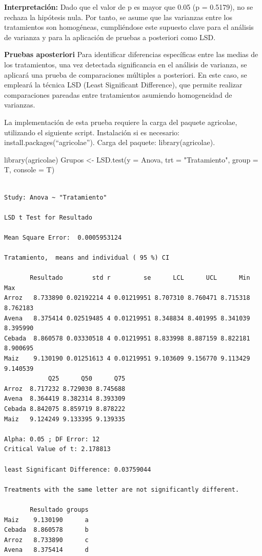 \documentclass[
  letterpaper,
  DIV=11,
  numbers=noendperiod]{scrreprt}
\newenvironment{Shaded}{\begin{snugshade}}{\end{snugshade}}
\newcommand{\AttributeTok}[1]{\textcolor[rgb]{0.40,0.45,0.13}{#1}}
\newcommand{\FunctionTok}[1]{\textcolor[rgb]{0.28,0.35,0.67}{#1}}
\newcommand{\NormalTok}[1]{\textcolor[rgb]{0.00,0.23,0.31}{#1}}
\newcommand{\OtherTok}[1]{\textcolor[rgb]{0.00,0.23,0.31}{#1}}
\newcommand{\StringTok}[1]{\textcolor[rgb]{0.13,0.47,0.30}{#1}}
\begin{document}
\textbf{Interpretación:} Dado que el valor de p es mayor que 0.05 (p =
0.5179), no se rechaza la hipótesis nula. Por tanto, se asume que las
varianzas entre los tratamientos son homogéneas, cumpliéndose este
supuesto clave para el análisis de varianza y para la aplicación de
pruebas a posteriori como LSD.

\textbf{Pruebas aposteriori} Para identificar diferencias específicas
entre las medias de los tratamientos, una vez detectada significancia en
el análisis de varianza, se aplicará una prueba de comparaciones
múltiples a posteriori. En este caso, se empleará la técnica LSD (Least
Significant Difference), que permite realizar comparaciones pareadas
entre tratamientos asumiendo homogeneidad de varianzas.

La implementación de esta prueba requiere la carga del paquete
agricolae, utilizando el siguiente script. Instalación si es necesario:
install.packages(``agricolae''). Carga del paquete: library(agricolae).

\begin{Shaded}
\begin{Highlighting}[]
\FunctionTok{library}\NormalTok{(agricolae)}
\NormalTok{Grupos }\OtherTok{\textless{}{-}} \FunctionTok{LSD.test}\NormalTok{(}\AttributeTok{y =}\NormalTok{ Anova, }\AttributeTok{trt =} \StringTok{"Tratamiento"}\NormalTok{, }\AttributeTok{group =}\NormalTok{ T, }\AttributeTok{console =}\NormalTok{ T)}
\end{Highlighting}
\end{Shaded}

\begin{verbatim}

Study: Anova ~ "Tratamiento"

LSD t Test for Resultado 

Mean Square Error:  0.0005953124 

Tratamiento,  means and individual ( 95 %) CI

       Resultado        std r         se      LCL      UCL      Min      Max
Arroz   8.733890 0.02192214 4 0.01219951 8.707310 8.760471 8.715318 8.762183
Avena   8.375414 0.02519485 4 0.01219951 8.348834 8.401995 8.341039 8.395990
Cebada  8.860578 0.03330518 4 0.01219951 8.833998 8.887159 8.822181 8.900695
Maiz    9.130190 0.01251613 4 0.01219951 9.103609 9.156770 9.113429 9.140539
            Q25      Q50      Q75
Arroz  8.717232 8.729030 8.745688
Avena  8.364419 8.382314 8.393309
Cebada 8.842075 8.859719 8.878222
Maiz   9.124249 9.133395 9.139335

Alpha: 0.05 ; DF Error: 12
Critical Value of t: 2.178813 

least Significant Difference: 0.03759044 

Treatments with the same letter are not significantly different.

       Resultado groups
Maiz    9.130190      a
Cebada  8.860578      b
Arroz   8.733890      c
Avena   8.375414      d
\end{verbatim}
\end{document}
